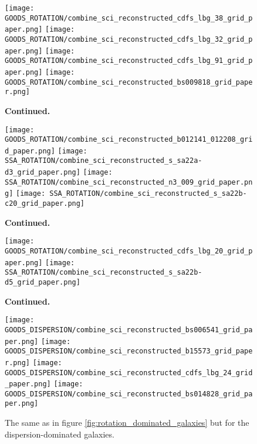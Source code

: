 \documentclass[fleqn,usenatbib]{mnras}
\begin{document}
\begin{figure*}\ContinuedFloat
    \centering

    \texttt{[image: GOODS\_ROTATION/combine\_sci\_reconstructed\_cdfs\_lbg\_38\_grid\_paper.png]}
    \texttt{[image: GOODS\_ROTATION/combine\_sci\_reconstructed\_cdfs\_lbg\_32\_grid\_paper.png]}
    \texttt{[image: GOODS\_ROTATION/combine\_sci\_reconstructed\_cdfs\_lbg\_91\_grid\_paper.png]}
    \texttt{[image: GOODS\_ROTATION/combine\_sci\_reconstructed\_bs009818\_grid\_paper.png]}

    \caption{\textbf{Continued.}}

\end{figure*}


\begin{figure*}\ContinuedFloat
    \centering

    \texttt{[image: GOODS\_ROTATION/combine\_sci\_reconstructed\_b012141\_012208\_grid\_paper.png]}
    \texttt{[image: SSA\_ROTATION/combine\_sci\_reconstructed\_s\_sa22a-d3\_grid\_paper.png]}
    \texttt{[image: SSA\_ROTATION/combine\_sci\_reconstructed\_n3\_009\_grid\_paper.png]}
    \texttt{[image: SSA\_ROTATION/combine\_sci\_reconstructed\_s\_sa22b-c20\_grid\_paper.png]}

    \caption{\textbf{Continued.}}

\end{figure*}

\begin{figure*}\ContinuedFloat
\centering

    \texttt{[image: GOODS\_ROTATION/combine\_sci\_reconstructed\_cdfs\_lbg\_20\_grid\_paper.png]}
    \texttt{[image: SSA\_ROTATION/combine\_sci\_reconstructed\_s\_sa22b-d5\_grid\_paper.png]}

    \caption{\textbf{Continued.}}

\end{figure*}

\begin{figure*}
    \centering

    \texttt{[image: GOODS\_DISPERSION/combine\_sci\_reconstructed\_bs006541\_grid\_paper.png]}
    \texttt{[image: GOODS\_DISPERSION/combine\_sci\_reconstructed\_b15573\_grid\_paper.png]}
    \texttt{[image: GOODS\_DISPERSION/combine\_sci\_reconstructed\_cdfs\_lbg\_24\_grid\_paper.png]}
    \texttt{[image: GOODS\_DISPERSION/combine\_sci\_reconstructed\_bs014828\_grid\_paper.png]}

    \caption{The same as in figure \protect\ref{fig:rotation_dominated_galaxies} but for the dispersion-dominated galaxies.}
    \label{fig:dispersion_dominated_galaxies}

\end{figure*}
\end{document}
